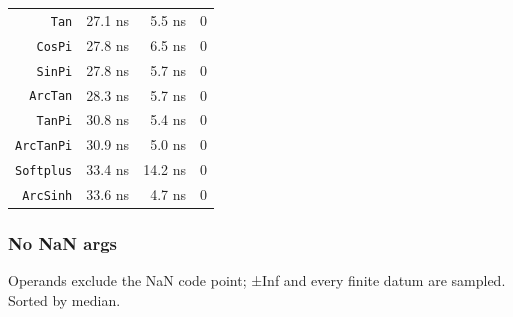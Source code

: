 \begin{table}[h]
\begin{tabulary}{\linewidth}{R R R R}
\texttt{Tan} & 27.1 ns & 5.5 ns & 0 \\
\texttt{CosPi} & 27.8 ns & 6.5 ns & 0 \\
\texttt{SinPi} & 27.8 ns & 5.7 ns & 0 \\
\texttt{ArcTan} & 28.3 ns & 5.7 ns & 0 \\
\texttt{TanPi} & 30.8 ns & 5.4 ns & 0 \\
\texttt{ArcTanPi} & 30.9 ns & 5.0 ns & 0 \\
\texttt{Softplus} & 33.4 ns & 14.2 ns & 0 \\
\texttt{ArcSinh} & 33.6 ns & 4.7 ns & 0 \\
\bottomrule
\end{tabulary}

\end{table}



\subsubsection{No NaN args}



\label{11020842090045916616}{}


Operands exclude the NaN code point; ±Inf and every finite datum are sampled. Sorted by median.




